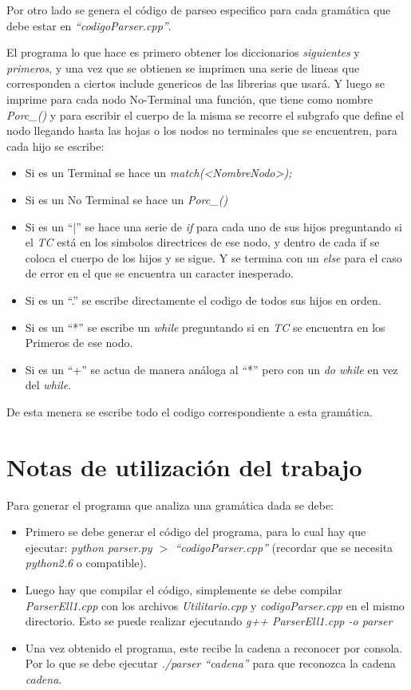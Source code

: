 \documentclass[a4paper]{report}
\begin{document}
Por otro lado se genera el código de parseo especifico para cada gramática que debe estar en \emph{``codigoParser.cpp''}.


El programa lo que hace es primero obtener los diccionarios \emph{siguientes} y \emph{primeros}, y una vez que se obtienen se imprimen una serie de lineas que corresponden a ciertos include genericos de las librerias que usará. Y luego se imprime para cada nodo No-Terminal una función, que tiene como nombre \emph{Porc\_<Nombre Nodo>()} y para escribir el cuerpo de la misma se recorre el subgrafo que define el nodo llegando hasta las hojas o los nodos no terminales que se encuentren, para cada hijo se escribe:


\begin{itemize}
\item Si es un Terminal se hace un \emph{match(<NombreNodo>);}
\item Si es un No Terminal se hace un \emph{Porc\_<Nombre Nodo>()}
\item Si es un ``|'' se hace una serie de \emph{if} para cada uno de sus hijos preguntando si el \emph{TC} está en los simbolos directrices de ese nodo, y dentro de cada if se coloca el cuerpo de los hijos y se sigue. Y se termina con un \emph{else} para el caso de error en el que se encuentra un caracter inesperado.
\item Si es un ``.'' se escribe directamente el codigo de todos sus hijos en orden.
\item Si es un ``*'' se escribe un \emph{while} preguntando si en \emph{TC} se encuentra en los Primeros de ese nodo.
\item Si es un ``+'' se actua de manera análoga al ``*'' pero con un \emph{do while} en vez del \emph{while}.
\end{itemize}


De esta menera se escribe todo el codigo correspondiente a esta gramática.

\section*{Notas de utilización del trabajo}

Para generar el programa que analiza una gramática dada se debe:
\begin{itemize}
\item Primero se debe generar el código del programa, para lo cual hay que ejecutar: \emph{python parser.py $>$ ``codigoParser.cpp''} (recordar que se necesita \emph{python2.6} o compatible).
\item Luego hay que compilar el código, simplemente se debe compilar \emph{ParserEll1.cpp} con los archivos \emph{Utilitario.cpp} y \emph{codigoParser.cpp} en el mismo directorio. Esto se puede realizar ejecutando \emph{g++ ParserEll1.cpp -o parser}
\item Una vez obtenido el programa, este recibe la cadena a reconocer por consola. Por lo que se debe ejecutar \emph{./parser ``cadena''} para que reconozca la cadena \emph{cadena}.
\end{itemize}
\end{document}
